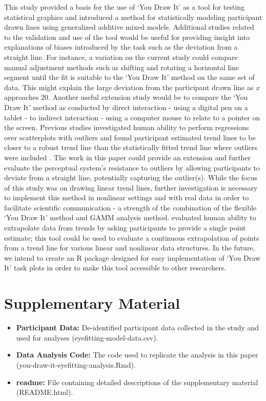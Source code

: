 \documentclass[12pt]{article}
\providecommand{\tightlist}{%
  \setlength{\itemsep}{0pt}\setlength{\parskip}{0pt}}
\begin{document}
This study provided a basis for the use of `You Draw It' as a tool for
testing statistical graphics and introduced a method for statistically
modeling participant drawn lines using generalized additive mixed
models. Additional studies related to the validation and use of the tool
would be useful for providing insight into explanations of biases
introduced by the task such as the deviation from a straight line. For
instance, a variation on the current study could compare manual
adjustment methods such as shifting and rotating a horizontal line
segment until the fit is suitable to the `You Draw It' method on the
same set of data. This might explain the large deviation from the
participant drawn line as \(x\) approaches 20. Another useful extension
study would be to compare the `You Draw It' method as conducted by
direct interaction - using a digital pen on a tablet - to indirect
interaction - using a computer mouse to relate to a pointer on the
screen. Previous studies investigated human ability to perform
regressions over scatterplots with outliers and found participant
estimated trend lines to be closer to a robust trend line than the
statistically fitted trend line where outliers were included
\citep{bobko_1979, correll_2017}. The work in this paper could provide
an extension and further evaluate the perceptual system's resistance to
outliers by allowing participants to deviate from a straight line,
potentially capturing the outlier(s). While the focus of this study was
on drawing linear trend lines, further investigation is necessary to
implement this method in nonlinear settings and with real data in order
to facilitate scientific communication - a strength of the combination
of the flexible `You Draw It' method and GAMM analysis method.
\citet{ciccione2021can} evaluated human ability to extrapolate data from
trends by asking participants to provide a single point estimate; this
tool could be used to evaluate a continuous extrapolation of points from
a trend line for various linear and nonlinear data structures. In the
future, we intend to create an R package designed for easy
implementation of `You Draw It' task plots in order to make this tool
accessible to other researchers.

\hypertarget{supplementary-material}{%
\section{Supplementary Material}\label{supplementary-material}}

\begin{itemize}
\tightlist
\item
  \textbf{Participant Data:} De-identified participant data collected in
  the study and used for analyses (eyefitting-model-data.csv).
\item
  \textbf{Data Analysis Code:} The code used to replicate the analysis
  in this paper (you-draw-it-eyefitting-analysis.Rmd).
\item
  \textbf{readme:} File containing detailed descriptions of the
  supplementary material (README.html).
\end{itemize}



\end{document}
